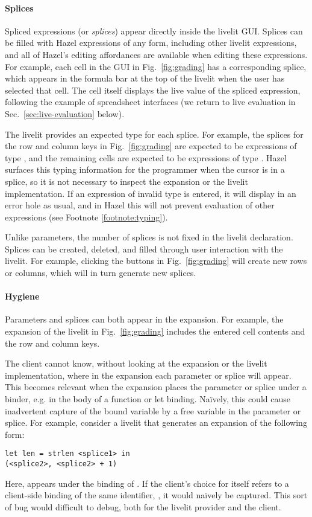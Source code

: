 \paragraph{Splices}\label{sec:splices}
Spliced expressions (or \emph{splices}) appear directly inside the livelit GUI.
Splices can be filled with Hazel expressions of any form, including other livelit expressions, 
and all of Hazel's editing affordances are available when editing these expressions.
For example, each cell in the  GUI in Fig.~\ref{fig:grading} 
has a corresponding splice, which appears in the formula bar at the top of the livelit 
when the user has selected that cell. 
The cell itself displays the live value of the spliced expression, 
following the example of spreadsheet interfaces 
(we return to live evaluation in Sec.~\ref{sec:live-evaluation} below).

The livelit provides an expected type for each splice.
For example, the splices for the row and column keys in Fig.~\ref{fig:grading} are expected to be expressions
of type , and the remaining cells are expected to be expressions of type . 
Hazel surfaces this typing information for the programmer when the cursor is in a splice, 
so it is not necessary to inspect the expansion or the livelit implementation.
If an expression of invalid type is entered, it will display in an error hole as usual,
and in Hazel this will not prevent evaluation of other expressions (see Footnote \ref{footnote:typing}).

Unlike parameters, the number of splices is not fixed in the livelit declaration. Splices can be created, 
deleted, and filled through user interaction with the livelit. For example, clicking the \li{+} buttons
in Fig.~\ref{fig:grading} will create new rows or columns, which will in turn generate new splices.

\paragraph{Hygiene}\label{sec:hygiene}
Parameters and splices can both appear in the expansion. For example,
the expansion of the  livelit in Fig.~\ref{fig:grading} includes the 
entered cell contents and the row and column keys.

The client cannot know, without looking at the expansion or the livelit implementation, 
where in the expansion each parameter or splice will appear. This becomes relevant when 
the expansion places the parameter or splice under a binder, e.g. in the body of a function or let binding.
Na\"ively, this could cause inadvertent capture of the bound variable by a free variable 
in the parameter or splice. For example, consider a livelit that generates an expansion 
of the following form:
\begin{lstlisting}[numbers=none]
let len = strlen <splice1> in 
(<splice2>, <splice2> + 1)
\end{lstlisting}
Here,  appears under the binding of . If the client's choice for 
 itself refers to a client-side binding of the same identifier, ,
it would na\"ively be captured. This sort of bug would difficult to debug, 
both for the livelit provider and the client. 

